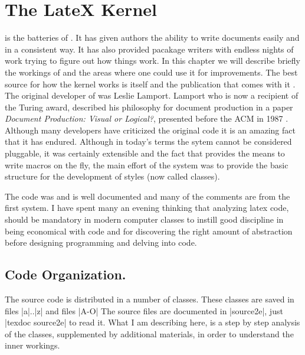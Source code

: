 
\chapter{The LateX Kernel}


\latex is the batteries of \tex. It has given authors the ability to write documents easily and in a consistent way. It has also provided pacakage writers with endless nights of work trying to figure out how things work. In this chapter we will describe briefly the workings of \latex and the areas where one could use it for improvements. The best source for how the \latex kernel works is \latex itself and the publication that comes with it .
The original developer of \latex was Leslie Lamport. Lamport who is now a recipient of the Turing award, described his philosophy for document production in a paper \textit{Document Production: Visual or Logical?}, presented before the ACM in 1987 \cite{lamport1987}. Although many developers have criticized the original code it is an amazing fact that it has endured. Although in today’s terms the sytem cannot be considered pluggable, it was
certainly extensible and the fact that \tex provides the means to write macros on the fly, the main effort
of the \latexe system was to provide the basic structure for the development of styles (now called classes).

The code was and is well documented and many of the comments are from the first system. I have spent many an
evening thinking that analyzing latex code, should be mandatory in modern computer classes to instill
good discipline in being economical with code and for discovering the right amount of abstraction before designing programming and delving into code.

\section{Code Organization.} 

The \latex source code is distributed in a number of classes. These classes are saved in files |a|..|z| and files |A-O| The source files are documented in |source2e|, just |texdoc source2e| to read it. What I am describing here, is a step by step analysis of the classes, supplemented by additional materials, in order to understand the inner workings. 

